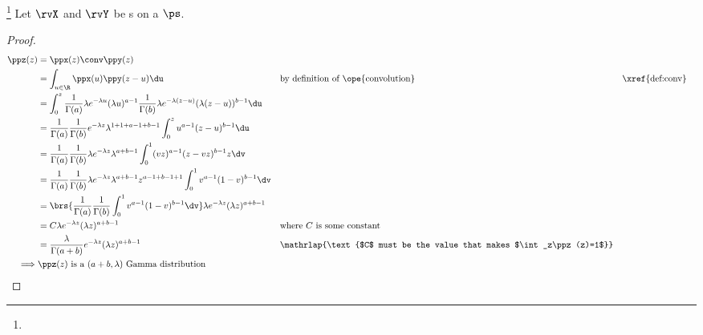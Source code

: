 \begin{theorem}
\label{thm:Gamma_X+Y}
\footnote{
  }
Let $\rvX$ and $\rvY$ be s on a  $\ps$.
\end{theorem}
\begin{proof}
\begin{align*}
  \ppz(z)
    &= \ppx(z)\conv\ppy(z)
  \\&= \int_{u\in\R} \ppx(u)\ppy(z-u) \du
    && \text{by definition of \ope{convolution}}
    && \text{\xref{def:conv}}
  \\&= \int_0^z
       \frac{1}{\Gamma(a)}\lambda e^{-\lambda u}(\lambda u)^{a-1}
       \frac{1}{\Gamma(b)}\lambda e^{-\lambda(z-u)}(\lambda(z-u))^{b-1}
       \du
  \\&= \frac{1}{\Gamma(a)}\frac{1}{\Gamma(b)}e^{-\lambda z}\lambda^{1+1+a-1+b-1}
       \int_0^z  u^{a-1}(z-u)^{b-1}  \du
  \\&= \frac{1}{\Gamma(a)}\frac{1}{\Gamma(b)}\lambda e^{-\lambda z}\lambda^{a+b-1}
       \int_0^1  (vz)^{a-1}(z-vz)^{b-1}  z\dv
  \\&= \frac{1}{\Gamma(a)}\frac{1}{\Gamma(b)}\lambda e^{-\lambda z}\lambda^{a+b-1}
       z^{a-1+b-1+1}
       \int_0^1  v^{a-1}(1-v)^{b-1}  \dv
  \\&= \brs{
       \frac{1}{\Gamma(a)}\frac{1}{\Gamma(b)}
       \int_0^1  v^{a-1}(1-v)^{b-1}  \dv
       }
       \lambda e^{-\lambda z}(\lambda z)^{a+b-1}
  \\&= C\lambda e^{-\lambda z}(\lambda z)^{a+b-1}
    && \text{where $C$ is some constant}
  \\&= \frac{\lambda}{\Gamma(a+b)} e^{-\lambda z}(\lambda z)^{a+b-1}
    &&\mathrlap{\text{$C$ must be the value that makes $\int_z\ppz(z)=1$}}
\\\implies & \text{$\ppz(z)$ is a $(a+b,\lambda)$ Gamma distribution}
\end{align*}
\end{proof}

